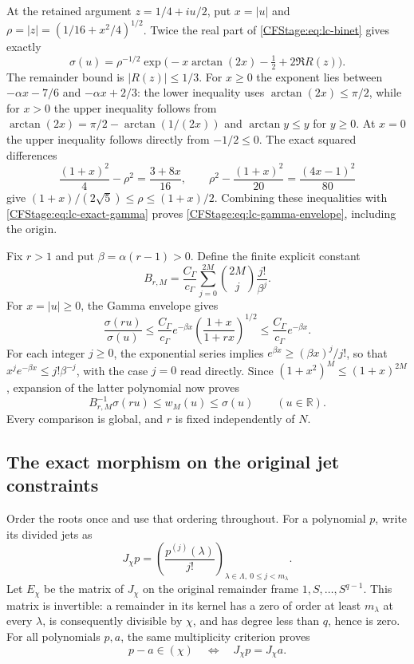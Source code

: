 At the retained argument $z=1/4+iu/2$, put
$x=|u|$ and $\rho=|z|=(1/16+x^2/4)^{1/2}$. Twice the real part of
\eqref{CFStage:eq:lc-binet} gives exactly
\[
 \sigma(u)=\rho^{-1/2}
 \exp\bigl(-x\arctan(2x)-\tfrac12+2\Re R(z)\bigr).
 \tag{LC.6}\label{CFStage:eq:lc-exact-gamma}
\]
The remainder bound is $|R(z)|\le1/3$. For $x\ge0$ the exponent lies
between $-\alpha x-7/6$ and $-\alpha x+2/3$: the lower inequality uses
$\arctan(2x)\le\pi/2$, while for $x>0$ the upper inequality follows from
$\arctan(2x)=\pi/2-\arctan(1/(2x))$ and
$\arctan y\le y$ for $y\ge0$. At $x=0$ the upper inequality follows
directly from $-1/2\le0$. The exact squared differences
\[
 \frac{(1+x)^2}{4}-\rho^2=\frac{3+8x}{16},
 \qquad
 \rho^2-\frac{(1+x)^2}{20}=\frac{(4x-1)^2}{80}
\]
give $(1+x)/(2\sqrt5)\le\rho\le(1+x)/2$. Combining these inequalities
with \eqref{CFStage:eq:lc-exact-gamma} proves \eqref{CFStage:eq:lc-gamma-envelope}, including
the origin.

Fix $r>1$ and put $\beta=\alpha(r-1)>0$. Define the finite explicit constant
\[
 B_{r,M}=\frac{C_\Gamma}{c_\Gamma}
 \sum_{j=0}^{2M}\binom{2M}{j}\frac{j!}{\beta^j}.
 \tag{LC.7}\label{CFStage:eq:lc-constant}
\]
For $x=|u|\ge0$, the Gamma envelope gives
\[
 \frac{\sigma(ru)}{\sigma(u)}
 \le\frac{C_\Gamma}{c_\Gamma}e^{-\beta x}
 \left(\frac{1+x}{1+rx}\right)^{1/2}
 \le\frac{C_\Gamma}{c_\Gamma}e^{-\beta x}.
\]
For each integer $j\ge0$, the exponential series implies
$e^{\beta x}\ge(\beta x)^j/j!$, so that
$x^je^{-\beta x}\le j!\beta^{-j}$, with the case $j=0$ read directly.
Since $(1+x^2)^M\le(1+x)^{2M}$, expansion of the latter polynomial now proves
\[
 B_{r,M}^{-1}\sigma(ru)\le w_M(u)\le\sigma(u)
 \qquad(u\in\mathbb R).
 \tag{LC.8}\label{CFStage:eq:lc-pointwise-sandwich}
\]
Every comparison is global, and $r$ is fixed independently of $N$.

\subsection{The exact morphism on the original jet constraints}

Order the roots once and use that ordering throughout. For a polynomial $p$,
write its divided jets as
\[
 J_\chi p=\left(\frac{p^{(j)}(\lambda)}{j!}\right)_
 {\lambda\in\Lambda,\ 0\le j<m_\lambda}.
\]
Let $E_\chi$ be the matrix of $J_\chi$ on the original remainder frame
$1,S,\ldots,S^{q-1}$. This matrix is invertible: a remainder in its kernel
has a zero of order at least $m_\lambda$ at every $\lambda$, is consequently
divisible by $\chi$, and has degree less than $q$, hence is zero.
For all polynomials $p,a$, the same multiplicity criterion proves
\[
 p-a\in(\chi)\quad\Longleftrightarrow\quad J_\chi p=J_\chi a.
 \tag{LC.9}\label{CFStage:eq:lc-exact-constraints}
\]

